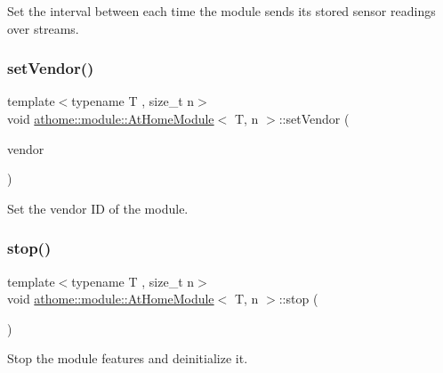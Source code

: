 Set the interval between each time the module sends its stored sensor readings over streams. \mbox{\label{classathome_1_1module_1_1_at_home_module_a9fdaf9bb63d3229bf3135d5e0d21b74c}} 
\subsubsection{\texorpdfstring{set\+Vendor()}{setVendor()}}
{\footnotesize\ttfamily template$<$typename T , size\+\_\+t n$>$ \\
void \mbox{\hyperlink{classathome_1_1module_1_1_at_home_module}{athome\+::module\+::\+At\+Home\+Module}}$<$ T, n $>$\+::set\+Vendor (\begin{DoxyParamCaption}\item[{const \mbox{\hyperlink{classathome_1_1module_1_1_at_home_module_a90432f050114b268f7f7e0598dd8c9ac}{module\+Vendor}} \&}]{vendor }\end{DoxyParamCaption})\hspace{0.3cm}{\ttfamily [inline]}}

Set the vendor ID of the module. \mbox{\label{classathome_1_1module_1_1_at_home_module_a5589c1eb7edd2ab45d0a3de7bb475bbe}} 
\subsubsection{\texorpdfstring{stop()}{stop()}}
{\footnotesize\ttfamily template$<$typename T , size\+\_\+t n$>$ \\
void \mbox{\hyperlink{classathome_1_1module_1_1_at_home_module}{athome\+::module\+::\+At\+Home\+Module}}$<$ T, n $>$\+::stop (\begin{DoxyParamCaption}{ }\end{DoxyParamCaption})\hspace{0.3cm}{\ttfamily [inline]}}

Stop the module features and deinitialize it. \mbox{\label{classathome_1_1module_1_1_at_home_module_a4fd5a07603ff4cb512d201352aa2be0a}} 
